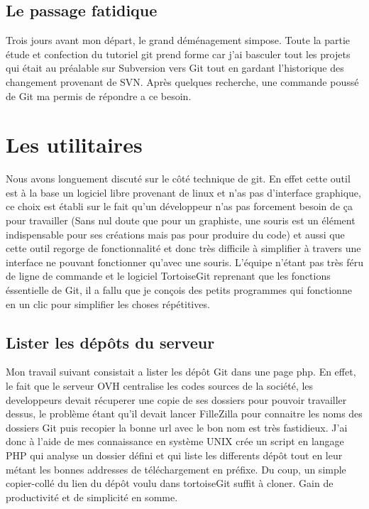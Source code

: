 \subsection{Le passage fatidique} %
\label{sec:Le passage fatidique}

Trois jours avant mon départ, le grand déménagement simpose. Toute la partie
étude et confection du tutoriel git prend forme car j'ai basculer tout les
projets qui était au préalable sur Subversion vers Git tout en gardant
l'historique des changement provenant de SVN. Après quelques recherche, une
commande poussé de Git ma permis de répondre a ce besoin.

\section{Les utilitaires} %

Nous avons longuement discuté sur le côté technique de git. En effet cette
outil est à la base un logiciel libre provenant de linux et n'as pas
d'interface graphique, ce choix est établi sur le fait qu'un développeur n'as
pas forcement besoin de ça pour travailler (Sans nul doute que pour un
graphiste, une souris est un élément indispensable pour ses créations mais pas
pour produire du code) et aussi que cette outil regorge de fonctionnalité et
donc très difficile à simplifier à travers une interface ne pouvant fonctionner
qu'avec une souris. L'équipe n'étant pas très féru de ligne de commande et le
logiciel TortoiseGit reprenant que les fonctions éssentielle de Git, il a fallu
que je conçois des petits programmes qui fonctionne en un clic pour simplifier
les choses répétitives.


\subsection{Lister les dépôts du serveur}

Mon travail suivant consistait a lister les dépôt Git dans une page php. En
effet, le fait que le serveur OVH centralise les codes sources de la société,
les developpeurs devait récuperer une copie de ses dossiers pour pouvoir
travailler dessus, le problème étant qu'il devait lancer FilleZilla pour
connaitre les noms des dossiers Git puis recopier la bonne url avec le bon nom
est très fastidieux. J'ai donc à l'aide de mes connaissance en système UNIX
crée un script en langage PHP qui analyse un dossier défini et qui liste les
differents dépôt tout en leur métant les bonnes addresses de téléchargement en
préfixe. Du coup, un simple copier-collé du lien du dépôt voulu dans
tortoiseGit suffit à cloner. Gain de productivité et de simplicité en somme.

